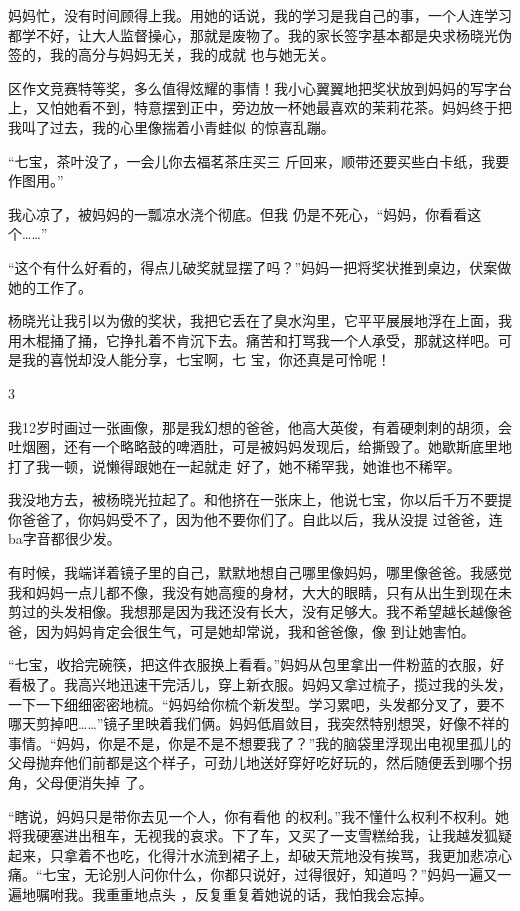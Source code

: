 \documentclass{article}
\begin{document}
妈妈忙，没有时间顾得上我。用她的话说，我的学习是我自己的事，一个人连学习都学不好，让大人监督操心，那就是废物了。我的家长签字基本都是央求杨晓光伪签的，我的高分与妈妈无关，我的成就
也与她无关。 

区作文竞赛特等奖，多么值得炫耀的事情！我小心翼翼地把奖状放到妈妈的写字台上，又怕她看不到，特意摆到正中，旁边放一杯她最喜欢的茉莉花茶。妈妈终于把我叫了过去，我的心里像揣着小青蛙似
的惊喜乱蹦。 

“七宝，茶叶没了，一会儿你去福茗茶庄买三
斤回来，顺带还要买些白卡纸，我要作图用。” 

我心凉了，被妈妈的一瓢凉水浇个彻底。但我
仍是不死心，“妈妈，你看看这个……” 

“这个有什么好看的，得点儿破奖就显摆了吗？”妈妈一把将奖状推到桌边，伏案做她的工作了。
\newpage

 

杨晓光让我引以为傲的奖状，我把它丢在了臭水沟里，它平平展展地浮在上面，我用木棍捅了捅，它挣扎着不肯沉下去。痛苦和打骂我一个人承受，那就这样吧。可是我的喜悦却没人能分享，七宝啊，七
宝，你还真是可怜呢！ 


3 

我12岁时画过一张画像，那是我幻想的爸爸，他高大英俊，有着硬刺刺的胡须，会吐烟圈，还有一个略略鼓的啤酒肚，可是被妈妈发现后，给撕毁了。她歇斯底里地打了我一顿，说懒得跟她在一起就走
好了，她不稀罕我，她谁也不稀罕。 

我没地方去，被杨晓光拉起了。和他挤在一张床上，他说七宝，你以后千万不要提你爸爸了，你妈妈受不了，因为他不要你们了。自此以后，我从没提
过爸爸，连ba字音都很少发。 

\newpage

有时候，我端详着镜子里的自己，默默地想自己哪里像妈妈，哪里像爸爸。我感觉我和妈妈一点儿都不像，我没有她高瘦的身材，大大的眼睛，只有从出生到现在未剪过的头发相像。我想那是因为我还没有长大，没有足够大。我不希望越长越像爸爸，因为妈妈肯定会很生气，可是她却常说，我和爸爸像，像
到让她害怕。 

“七宝，收拾完碗筷，把这件衣服换上看看。”妈妈从包里拿出一件粉蓝的衣服，好看极了。我高兴地迅速干完活儿，穿上新衣服。妈妈又拿过梳子，揽过我的头发，一下一下细细密密地梳。“妈妈给你梳个新发型。学习累吧，头发都分叉了，要不哪天剪掉吧……”镜子里映着我们俩。妈妈低眉敛目，我突然特别想哭，好像不祥的事情。“妈妈，你是不是，你是不是不想要我了？”我的脑袋里浮现出电视里孤儿的父母抛弃他们前都是这个样子，可劲儿地送好穿好吃好玩的，然后随便丢到哪个拐角，父母便消失掉
了。 

“瞎说，妈妈只是带你去见一个人，你有看他
\newpage
的权利。”我不懂什么权利不权利。她将我硬塞进出租车，无视我的哀求。下了车，又买了一支雪糕给我，让我越发狐疑起来，只拿着不也吃，化得汁水流到裙子上，却破天荒地没有挨骂，我更加悲凉心痛。“七宝，无论别人问你什么，你都只说好，过得很好，知道吗？”妈妈一遍又一遍地嘱咐我。我重重地点头
，反复重复着她说的话，我怕我会忘掉。 
\end{document}
